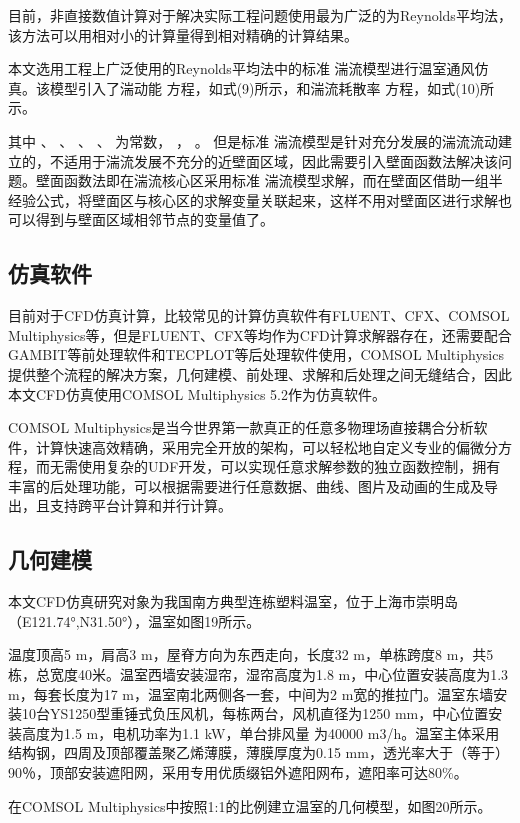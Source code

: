 目前，非直接数值计算对于解决实际工程问题使用最为广泛的为Reynolds平均法，该方法可以用相对小的计算量得到相对精确的计算结果。

本文选用工程上广泛使用的Reynolds平均法中的标准 湍流模型进行温室通风仿真。该模型引入了湍动能 方程，如式(9)所示，和湍流耗散率 方程，如式(10)所示。

其中 、 、 、 、 为常数， ， 。
但是标准 湍流模型是针对充分发展的湍流流动建立的，不适用于湍流发展不充分的近壁面区域，因此需要引入壁面函数法解决该问题。壁面函数法即在湍流核心区采用标准 湍流模型求解，而在壁面区借助一组半经验公式，将壁面区与核心区的求解变量关联起来，这样不用对壁面区进行求解也可以得到与壁面区域相邻节点的变量值了。
	\subsection{仿真软件}
	目前对于CFD仿真计算，比较常见的计算仿真软件有FLUENT、CFX、COMSOL Multiphysics等，但是FLUENT、CFX等均作为CFD计算求解器存在，还需要配合GAMBIT等前处理软件和TECPLOT等后处理软件使用，COMSOL Multiphysics提供整个流程的解决方案，几何建模、前处理、求解和后处理之间无缝结合，因此本文CFD仿真使用COMSOL Multiphysics 5.2作为仿真软件。
	
COMSOL Multiphysics是当今世界第一款真正的任意多物理场直接耦合分析软件，计算快速高效精确，采用完全开放的架构，可以轻松地自定义专业的偏微分方程，而无需使用复杂的UDF开发，可以实现任意求解参数的独立函数控制，拥有丰富的后处理功能，可以根据需要进行任意数据、曲线、图片及动画的生成及导出，且支持跨平台计算和并行计算。

	\subsection{几何建模}
本文CFD仿真研究对象为我国南方典型连栋塑料温室，位于上海市崇明岛（E121.74°,N31.50°），温室如图19所示。
 
温度顶高5 m，肩高3 m，屋脊方向为东西走向，长度32 m，单栋跨度8 m，共5栋，总宽度40米。温室西墙安装湿帘，湿帘高度为1.8 m，中心位置安装高度为1.3 m，每套长度为17 m，温室南北两侧各一套，中间为2 m宽的推拉门。温室东墙安装10台YS1250型重锤式负压风机，每栋两台，风机直径为1250 mm，中心位置安装高度为1.5 m，电机功率为1.1 kW，单台排风量 为40000 m3/h。温室主体采用结构钢，四周及顶部覆盖聚乙烯薄膜，薄膜厚度为0.15 mm，透光率大于（等于）90％，顶部安装遮阳网，采用专用优质缀铝外遮阳网布，遮阳率可达80\%。

在COMSOL Multiphysics中按照1:1的比例建立温室的几何模型，如图20所示。

